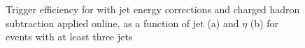 \begin{figure}[hbtp]
    \centering
{}
\hfill
{}
\caption[Trigger efficiency for \HLTThreeCentralPFJet as a function of jet \pt and $\eta$]{Trigger efficiency for
\HLTThreeCentralPFJet with jet energy corrections and charged hadron subtraction applied online, as a function of jet
\pt (a) and $\eta$ (b) for events with at least three jets}
\label{fig:top_hlt_pt_eta_JEC_PFnoPU_3jets} 
 \end{figure}


